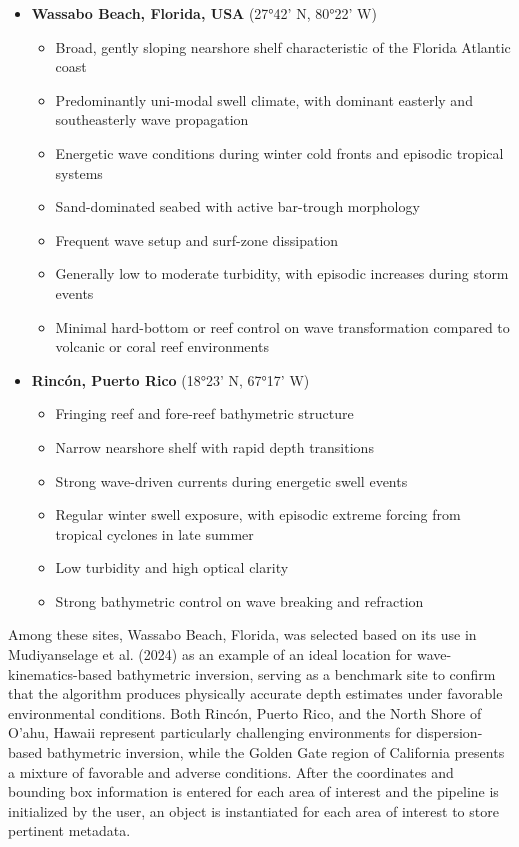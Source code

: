 \documentclass[12pt]{article}
\begin{document}
{\begin{itemize}
    \item \textbf{Wassabo Beach, Florida, USA} (27°42' N, 80°22' W)
    \begin{itemize}
        \item Broad, gently sloping nearshore shelf characteristic of the Florida Atlantic coast
        \item Predominantly uni-modal swell climate, with dominant easterly and southeasterly wave propagation
        \item Energetic wave conditions during winter cold fronts and episodic tropical systems
        \item Sand-dominated seabed with active bar-trough morphology
        \item Frequent wave setup and surf-zone dissipation
        \item Generally low to moderate turbidity, with episodic increases during storm events
        \item Minimal hard-bottom or reef control on wave transformation compared to volcanic or coral reef environments
    \end{itemize}

    \item \textbf{Rincón, Puerto Rico} (18°23' N, 67°17' W)
    \begin{itemize}
        \item Fringing reef and fore-reef bathymetric structure
        \item Narrow nearshore shelf with rapid depth transitions
        \item Strong wave-driven currents during energetic swell events
        \item Regular winter swell exposure, with episodic extreme forcing from tropical cyclones in late summer
        \item Low turbidity and high optical clarity
        \item Strong bathymetric control on wave breaking and refraction
    \end{itemize}

\end{itemize}
}

Among these sites, Wassabo Beach, Florida, was selected based on its use in Mudiyanselage et al. (2024) as an example of an ideal location for wave-kinematics-based bathymetric inversion, serving as a benchmark site to confirm that the algorithm produces physically accurate depth estimates under favorable environmental conditions. Both Rincón, Puerto Rico, and the North Shore of O'ahu, Hawaii represent particularly challenging environments for dispersion-based bathymetric inversion, while the Golden Gate region of California presents a mixture of favorable and adverse conditions. After the coordinates and bounding box information is entered for each area of interest and the pipeline is initialized by the user, an object is instantiated for each area of interest to store pertinent metadata.
\end{document}
